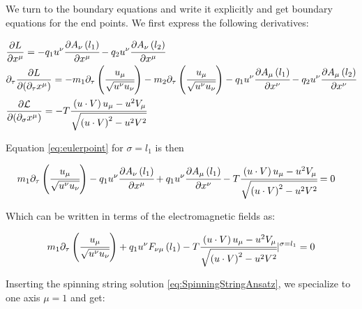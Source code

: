 \documentclass[11pt,a4paper]{article}
\begin{document}
We turn to the boundary equations and write it explicitly and get boundary equations for the end points.
We first express the following derivatives:

\begin{align}
&\frac{\partial L}{\partial x^{\mu}}=-q_{1}u^{\nu}\cfrac{\partial A_{\nu}\left(l_{1}\right)}{\partial x^{\mu}}-q_{2}u^{\nu}\cfrac{\partial A_{\nu}\left(l_{2}\right)}{\partial x^{\mu}} \\
&\partial_{\tau}\frac{\partial L}{\partial(\partial_{\tau}x^{\mu})}=-m_{1}\partial_{\tau}\left(\cfrac{u_{\mu}}{\sqrt{u^{\nu}u_{\nu}}}\right)-m_{2}\partial_{\tau}\left(\cfrac{u_{\mu}}{\sqrt{u^{\nu}u_{\nu}}}\right)-q_{1}u^{\nu}\cfrac{\partial A_{\mu}\left(l_{1}\right)}{\partial x^{\nu}}-q_{2}u^{\nu}\cfrac{\partial A_{\mu}\left(l_{2}\right)}{\partial x^{\nu}} \\
&\frac{\partial\mathcal{L}}{\partial(\partial_{\sigma}x^{\mu})}=-T\cfrac{\left(u\cdot V\right)u_{\mu}-u^{2}V_{\mu}}{\sqrt{\left(u\cdot V\right)^{2}-u^{2}V^{2}}}
\end{align}

Equation \ref{eq:eulerpoint} for $ \sigma=l_1 $ is then

\begin{align*}
&m_{1}\partial_{\tau}\left(\cfrac{u_{\mu}}{\sqrt{u^{\nu}u_{\nu}}}\right)
-q_{1}u^{\nu}\cfrac{\partial A_{\nu}\left(l_{1}\right)}{\partial x^{\mu}}
+q_{1}u^{\nu}\cfrac{\partial A_{\mu}\left(l_{1}\right)}{\partial x^{\nu}}-T\cfrac{\left(u\cdot V\right)u_{\mu}-u^{2}V_{\mu}}{\sqrt{\left(u\cdot V\right)^{2}-u^{2}V^{2}}}=0
\end{align*}

Which can be written in terms of the electromagnetic fields as:

\begin{equation*}
m_{1}\partial_{\tau}\left(\cfrac{u_{\mu}}{\sqrt{u^{\nu}u_{\nu}}}\right)+q_{1}u^{\nu}F_{\nu\mu}\left(l_{1}\right)-T\cfrac{\left(u\cdot V\right)u_{\mu}-u^{2}V_{\mu}}{\sqrt{\left(u\cdot V\right)^{2}-u^{2}V^{2}}}|^{\sigma=l_{1}}=0
\end{equation*}

Inserting the spinning string solution \ref{eq:SpinningStringAnsatz}, we specialize to one axis $\mu=1$ and get:
\end{document}
